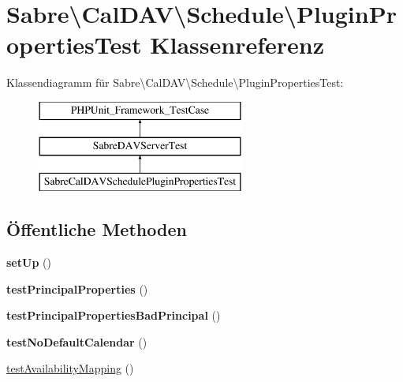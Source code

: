 \hypertarget{class_sabre_1_1_cal_d_a_v_1_1_schedule_1_1_plugin_properties_test}{}\section{Sabre\textbackslash{}Cal\+D\+AV\textbackslash{}Schedule\textbackslash{}Plugin\+Properties\+Test Klassenreferenz}
\label{class_sabre_1_1_cal_d_a_v_1_1_schedule_1_1_plugin_properties_test}
Klassendiagramm für Sabre\textbackslash{}Cal\+D\+AV\textbackslash{}Schedule\textbackslash{}Plugin\+Properties\+Test\+:\begin{figure}[H]
\begin{center}
\leavevmode
\includegraphics[height=3.000000cm]{class_sabre_1_1_cal_d_a_v_1_1_schedule_1_1_plugin_properties_test}
\end{center}
\end{figure}
\subsection*{Öffentliche Methoden}
\begin{DoxyCompactItemize}
\item 
\mbox{\label{class_sabre_1_1_cal_d_a_v_1_1_schedule_1_1_plugin_properties_test_ab57f76592ab7b4f478b120dbd1f01bfa}} 
{\bfseries set\+Up} ()
\item 
\mbox{\label{class_sabre_1_1_cal_d_a_v_1_1_schedule_1_1_plugin_properties_test_a8115ed9458334cc92cbe92f9d9f1d17a}} 
{\bfseries test\+Principal\+Properties} ()
\item 
\mbox{\label{class_sabre_1_1_cal_d_a_v_1_1_schedule_1_1_plugin_properties_test_a0f281ac45089550dda231894e8293bd0}} 
{\bfseries test\+Principal\+Properties\+Bad\+Principal} ()
\item 
\mbox{\label{class_sabre_1_1_cal_d_a_v_1_1_schedule_1_1_plugin_properties_test_ac4e9d00548aadbc47c76f8c79a6420ec}} 
{\bfseries test\+No\+Default\+Calendar} ()
\item 
\mbox{\hyperlink{class_sabre_1_1_cal_d_a_v_1_1_schedule_1_1_plugin_properties_test_a33bcdfb57f3cdffd69d302105f4c549e}{test\+Availability\+Mapping}} ()
\end{DoxyCompactItemize}
